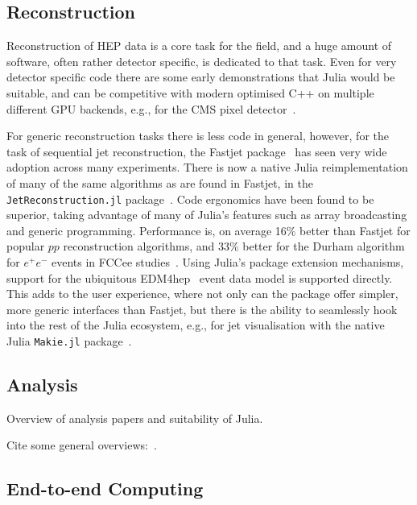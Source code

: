 \documentclass{webofc}
\begin{document}
\subsection{Reconstruction}

Reconstruction of HEP data is a core task for the field, and a huge amount of
software, often rather detector specific, is dedicated to that task. Even for
very detector specific code there are some early demonstrations that Julia would
be suitable, and can be competitive with modern optimised C++ on multiple
different GPU backends, e.g., for the CMS pixel detector~\cite{patatrack_julia}.

For generic reconstruction tasks there is less code in general, however, for the
task of sequential jet reconstruction, the Fastjet
package~\cite{Cacciari:2011ma} has seen very wide adoption across many
experiments. There is now a native Julia reimplementation of many of the same
algorithms as are found in Fastjet, in the \texttt{JetReconstruction.jl}
package~\cite{polyglot-jets-conference,stewart_2025_14945660}. Code ergonomics
have been found to be superior, taking advantage of many of Julia's features
such as array broadcasting and generic programming. Performance is, on average
16\% better than Fastjet for popular $pp$ reconstruction algorithms, and 33\%
better for the Durham algorithm for $e^+e^-$ events in FCCee
studies~\cite{fast-jet-reco-julia}. Using Julia's package extension mechanisms,
support for the ubiquitous EDM4hep~\cite{Gaede:2022leb} event data model is
supported directly. This adds to the user experience, where not only can the
package offer simpler, more generic interfaces than Fastjet, but there is the
ability to seamlessly hook into the rest of the Julia ecosystem, e.g., for jet
visualisation with the native Julia \texttt{Makie.jl}
package~\cite{Danisch2021}.

\subsection{Analysis}

Overview of analysis papers and suitability of Julia.

Cite some general overviews:~\cite{Stanitzki:2020bnx,eschle2023potential}.

\subsection{End-to-end Computing}
\end{document}
